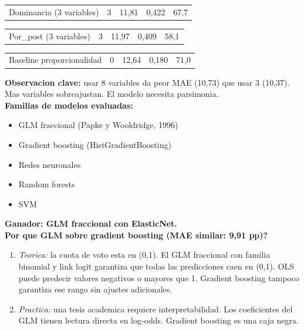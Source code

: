 \documentclass[11pt,a4paper]{article}
\begin{document}
{\begin{center}
\begin{tabular}{lllll}
\hline
Dominancia (3 variables) & 3 & 11,81 & 0,422 & 67,7%
\hline
\end{tabular}
\end{center}
\begin{center}
\begin{tabular}{lllll}
\hline
Por_post (3 variables) & 3 & 11,97 & 0,409 & 58,1%
\hline
\end{tabular}
\end{center}
\begin{center}
\begin{tabular}{lllll}
\hline
Baseline proporcionalidad & 0 & 12,64 & 0,180 & 71,0%
\hline
\end{tabular}
\end{center}

\textbf{Observacion clave:} usar 8 variables da peor MAE (10,73) que usar 3 (10,37). Mas variables sobreajustan. El modelo necesita parsimonia.\\[2pt]

\textbf{Familias de modelos evaluadas:}\\[2pt]
\begin{itemize}[noitemsep,topsep=2pt]
\item GLM fraccional (Papke y Wooldridge, 1996)
\item Gradient boosting (HistGradientBoosting)
\item Redes neuronales
\item Random forests
\item SVM
\end{itemize}

\textbf{Ganador: GLM fraccional con ElasticNet.}\\[2pt]

\textbf{Por que GLM sobre gradient boosting (MAE similar: 9,91 pp)?}\\[2pt]
\begin{enumerate}[noitemsep,topsep=2pt]
\item \textit{Teorica:} la cuota de voto esta en (0,1). El GLM fraccional con familia binomial y link logit garantiza que todas las predicciones caen en (0,1). OLS puede predecir valores negativos o mayores que 1. Gradient boosting tampoco garantiza ese rango sin ajustes adicionales.
\item \textit{Practica:} una tesis academica requiere interpretabilidad. Los coeficientes del GLM tienen lectura directa en log-odds. Gradient boosting es una caja negra.
\end{enumerate}

}
\end{document}
